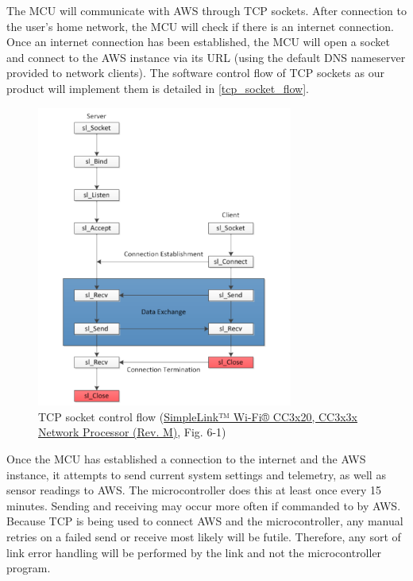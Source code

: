 \begin{flushleft}
    The MCU will communicate with AWS through TCP sockets. After connection to
    the user's home network, the MCU will check if there is an internet
    connection. Once an internet connection has been established, the MCU will
    open a socket and connect to the AWS instance via its URL (using the
    default DNS nameserver provided to network clients). The software control
    flow of TCP sockets as our product will implement them is detailed in
    \autoref{tcp_socket_flow}.
    \begin{figure}[H]
        \caption{TCP socket control flow (\href{https://www.ti.com/lit/ds/symlink/cc3220s.pdf}{SimpleLink™ Wi-Fi® CC3x20, CC3x3x Network Processor (Rev. M)}, Fig. 6-1)}
        \label{tcp_socket_flow}
        \centering
        \includegraphics[width=0.75\textwidth]{images/tcp_socket_flow.png}
    \end{figure}
\end{flushleft}
\begin{flushleft}
    Once the MCU has established a connection to the internet and the AWS
    instance, it attempts to send current system settings and telemetry, as
    well as sensor readings to AWS. The microcontroller does this at least
    once every 15 minutes. Sending and receiving may occur more often if
    commanded to by AWS. Because TCP is being used to connect AWS and the
    microcontroller, any manual retries on a failed send or receive most
    likely will be futile. Therefore, any sort of link error handling will
    be performed by the link and not the microcontroller program.
\end{flushleft}
